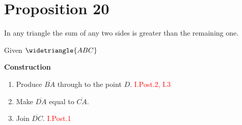 
\section*{Proposition 20}

\begin{thm}
In any triangle the sum of any two sides is greater than the remaining one.
\end{thm}

Given $\widetriangle{ABC}$

\begin{figure}[H]
\centering
	\caption{}
\end{figure}

\textbf{Construction}

\begin{enumerate}

\item Produce $\overline{BA}$ through to the point $D$. \hfill\textcolor{red}{ I.Post.2, I.3}
\item Make $\overline{DA}$ equal to $\overline{CA}$.

\begin{figure}[H]
\centering
	\caption{}
\end{figure}

\clearpage

\item Join $\overline{DC}$. \hfill\textcolor{red}{I.Post.1}

\begin{figure}[H]
\centering
	\caption{}
\end{figure}

\end{enumerate}

